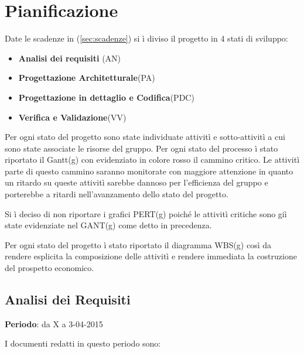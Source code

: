 \section{Pianificazione}

Date le scadenze in (\ref{sec:scadenze}) si \`{i} diviso il progetto in 4 stati di sviluppo:

\begin{itemize}

\item \textbf{Analisi dei requisiti} (AN)
\item \textbf{Progettazione Architetturale}(PA)
\item \textbf{Progettazione in dettaglio e Codifica}(PDC)
\item \textbf{Verifica e Validazione}(VV)

\end{itemize}

Per ogni stato del progetto sono state individuate attivit\`{i} e sotto-attivit\`{i} a cui sono state associate le risorse del gruppo.
Per ogni stato del processo \`{i} stato riportato il Gantt(g) con evidenziato in colore rosso il cammino critico.
Le attivit\`{i} parte di questo cammino saranno monitorate con maggiore attenzione in quanto un ritardo su queste attivit\`{i} 
sarebbe dannoso per l'efficienza del gruppo e porterebbe a ritardi nell'avanzamento dello stato del progetto.

Si \`{i} deciso di non riportare i grafici PERT(g) poich\'{e} le attivit\`{i} critiche sono gi\`{i} state evidenziate nel GANT(g) come detto in precedenza.

Per ogni stato del progetto \`{i} stato riportato il diagramma WBS(g) cos\`{i} da rendere esplicita la composizione delle attivit\`{i} e rendere immediata la costruzione del prospetto economico.

\subsection{Analisi dei Requisiti}
\textbf{Periodo}: da X a 3-04-2015

I documenti redatti in questo periodo sono:

